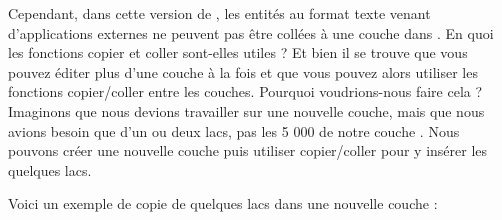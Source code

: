 Cependant, dans cette version de \qg, les entités au format texte venant d'applications externes ne peuvent pas être collées à une couche dans \qg. En quoi les fonctions copier et coller sont-elles utiles ? Et bien il se trouve que vous pouvez éditer plus d'une couche à la fois et que vous pouvez alors utiliser les fonctions copier/coller entre les couches. Pourquoi voudrions-nous faire cela ? Imaginons que nous devions travailler sur une nouvelle couche, mais que nous avions besoin que d'un ou deux lacs, pas les 5 000 de notre couche . Nous pouvons créer une nouvelle couche puis utiliser copier/coller pour y insérer les quelques lacs.

Voici un exemple de copie de quelques lacs dans une nouvelle couche :


